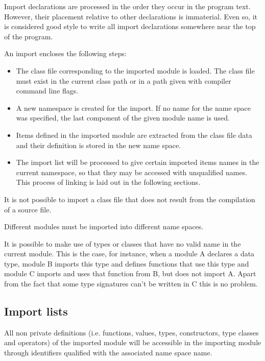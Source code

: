 
Import declarations are processed in the order they occur in the program text. 
However, their placement relative to other declarations is immaterial. 
Even so, it is considered good style to write all import declarations somewhere near the top of the program.

An import encloses the following steps:
\begin{itemize}
\item The class file corresponding to the imported module is loaded.
The class file must exist in the current class path or in a path given
with compiler command line flags.
\item A new namespace is created for the import. If no name for the name
space was specified, the last component of the given module name is
used.
\item Items defined in the imported module are extracted from the class file
data and their definition is stored in the new name space.
\item The import list will be processed to give certain imported items names in the current namespace, so that they may be accessed with unqualified names. This process of linking is laid out in the following sections.
\end{itemize}

It is not possible to import a \java{} class file that does not result
from the compilation of a \frege{} source file.

Different modules must be imported into different name spaces.

It is possible to make use of types or classes that have no valid name in the current module. 
This is the case, for instance, when a module A declares a data type, 
module B imports this type and defines functions that use this type 
and module C imports and uses that function from B, but does not import A. 
Apart from the fact that some type signatures can't be written in C this is no problem.

\subsection{Import lists}

All non private definitions (i.e. functions, values, types, constructors,
type classes and operators) of the imported module will be accessible in
the importing module through identifiers qualified with the associated
name space name.

